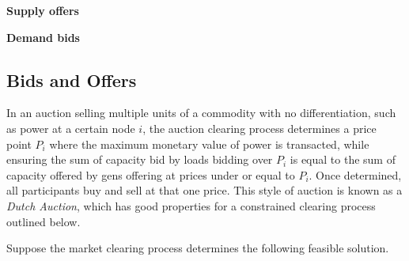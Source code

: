 \documentclass[11pt]{article}
\begin{document}
\begin{minipage}[t]{0.56\textwidth}
    \textbf{Supply offers}
    \begin{center}
    \scriptsize
    \end{center}

    \vspace{0.4em}
    \textbf{Demand bids}
    \begin{center}
    \scriptsize
    \end{center}
\end{minipage}

\subsection{Bids and Offers}
In an auction selling multiple units of a commodity with no differentiation, such as power at a certain node $i$, the auction clearing process determines a price point $P_i$ where the maximum monetary value of power is transacted, while ensuring the sum of capacity bid by loads bidding over $P_i$ is equal to the sum of capacity offered by gens offering at prices under or equal to $P_i$. Once determined, all participants buy and sell at that one price. This style of auction is known as a \textit{Dutch Auction}, which has good properties for a constrained clearing process outlined below.

\newpage
Suppose the market clearing process determines the following feasible solution.
\end{document}

